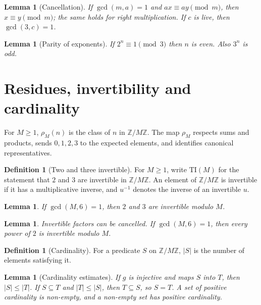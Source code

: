 \documentclass[11pt,reqno,oneside]{amsart}
\theoremstyle{plain}
\newtheorem{lemma}[theorem]{Lemma}
\theoremstyle{definition}
\newtheorem{definition}[theorem]{Definition}
\numberwithin{equation}{section}
\begin{document}
\begin{lemma}[Cancellation]\label{lem:cancel}
If $\gcd(m,a)=1$ and $ax\equiv ay\pmod m$, then $x\equiv y\pmod m$; the same holds for right multiplication. If $c$ is live, then $\gcd(3,c)=1$.
\end{lemma}

\begin{lemma}[Parity of exponents]\label{lem:parityexp}
If $2^n\equiv1\pmod3$ then $n$ is even. Also $3^n$ is odd.
\end{lemma}

\section{Residues, invertibility and cardinality}\label{sec:residues}

For $M\ge1$, $\rho_M(n)$ is the class of $n$ in $\mathbb Z/M\mathbb Z$. The map $\rho_M$ respects sums and products, sends $0,1,2,3$ to the expected elements, and identifies canonical representatives.

\begin{definition}[Two and three invertible]\label{def:inv23}
For $M\ge1$, write $\mathrm{TI}(M)$ for the statement that $2$ and $3$ are invertible in $\mathbb Z/M\mathbb Z$. An element of $\mathbb Z/M\mathbb Z$ is invertible if it has a multiplicative inverse, and $u^{-1}$ denotes the inverse of an invertible $u$.
\end{definition}

\begin{lemma}\label{lem:inv23}
If $\gcd(M,6)=1$, then $2$ and $3$ are invertible modulo $M$.
\end{lemma}

\begin{lemma}\label{lem:cancelinv}
Invertible factors can be cancelled. If $\gcd(M,6)=1$, then every power of $2$ is invertible modulo $M$.
\end{lemma}

\begin{definition}[Cardinality]\label{def:card}
For a predicate $S$ on $\mathbb Z/M\mathbb Z$, $|S|$ is the number of elements satisfying it.
\end{definition}

\begin{lemma}[Cardinality estimates]\label{lem:cardest}
If $g$ is injective and maps $S$ into $T$, then $|S|\le|T|$. If $S\subseteq T$ and $|T|\le|S|$, then $T\subseteq S$, so $S=T$. A set of positive cardinality is non-empty, and a non-empty set has positive cardinality.
\end{lemma}
\end{document}

